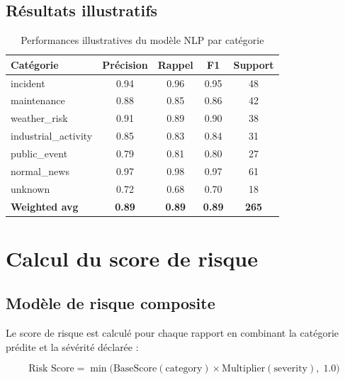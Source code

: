 \documentclass[1pt,a4paper]{report}
\begin{document}
\subsection{R\'{e}sultats illustratifs}

\begin{table}[H]
\centering
\caption{Performances illustratives du mod\`{e}le NLP par cat\'{e}gorie}
\label{tab:nlp_per_class}
\renewcommand{\arraystretch}{1.4}
\begin{tabular}{|l|c|c|c|c|}
\hline
\rowcolor{primaryblue!20}
\textbf{Cat\'{e}gorie} & \textbf{Pr\'{e}cision} & \textbf{Rappel} & \textbf{F1} & \textbf{Support} \\
\hline
incident & 0.94 & 0.96 & 0.95 & 48 \\
maintenance & 0.88 & 0.85 & 0.86 & 42 \\
weather\_risk & 0.91 & 0.89 & 0.90 & 38 \\
industrial\_activity & 0.85 & 0.83 & 0.84 & 31 \\
public\_event & 0.79 & 0.81 & 0.80 & 27 \\
normal\_news & 0.97 & 0.98 & 0.97 & 61 \\
unknown & 0.72 & 0.68 & 0.70 & 18 \\
\hline
\rowcolor{gray!15}
\textbf{Weighted avg} & \textbf{0.89} & \textbf{0.89} & \textbf{0.89} & \textbf{265} \\
\hline
\end{tabular}
\end{table}

\section{Calcul du score de risque}

\subsection{Mod\`{e}le de risque composite}

Le score de risque est calcul\'{e} pour chaque rapport en combinant la cat\'{e}gorie pr\'{e}dite et la s\'{e}v\'{e}rit\'{e} d\'{e}clar\'{e}e :

\begin{equation}
  \text{Risk Score} = \min\!\Big(\text{BaseScore}(\text{category}) \times \text{Multiplier}(\text{severity}),\; 1.0\Big)
  \label{eq:risk}
\end{equation}
\end{document}
